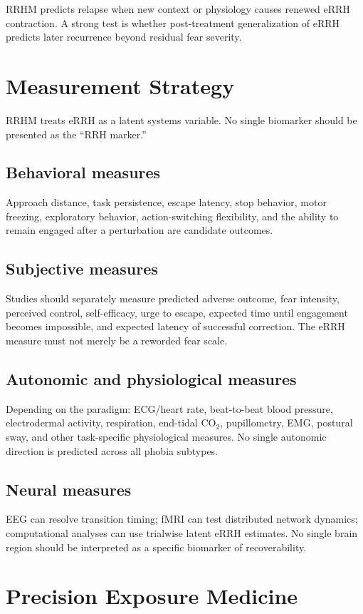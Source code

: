 \documentclass[11pt]{article}
\begin{document}
RRHM predicts relapse when new context or physiology causes renewed eRRH contraction. A strong test is whether post-treatment generalization of eRRH predicts later recurrence beyond residual fear severity.

\section{Measurement Strategy}

RRHM treats eRRH as a latent systems variable. No single biomarker should be presented as the ``RRH marker.''

\subsection{Behavioral measures}
Approach distance, task persistence, escape latency, stop behavior, motor freezing, exploratory behavior, action-switching flexibility, and the ability to remain engaged after a perturbation are candidate outcomes.

\subsection{Subjective measures}
Studies should separately measure predicted adverse outcome, fear intensity, perceived control, self-efficacy, urge to escape, expected time until engagement becomes impossible, and expected latency of successful correction. The eRRH measure must not merely be a reworded fear scale.

\subsection{Autonomic and physiological measures}
Depending on the paradigm: ECG/heart rate, beat-to-beat blood pressure, electrodermal activity, respiration, end-tidal CO$_2$, pupillometry, EMG, postural sway, and other task-specific physiological measures. No single autonomic direction is predicted across all phobia subtypes.

\subsection{Neural measures}
EEG can resolve transition timing; fMRI can test distributed network dynamics; computational analyses can use trialwise latent eRRH estimates. No single brain region should be interpreted as a specific biomarker of recoverability.

\section{Precision Exposure Medicine}
\end{document}
